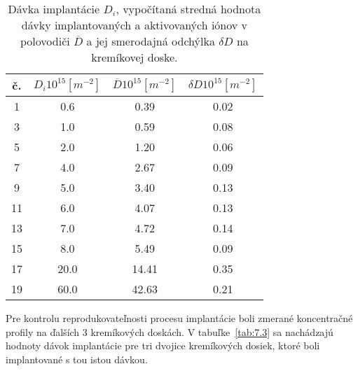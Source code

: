 \begin{table}[h!]\centering
  \begin{minipage}[c]{\myfiguresize}
    \begin{center}
      \begin{tabular}{c c c c}
        č. & ${D_{i}}{10}^{15}[m^{-2}]$ & $\overline{D}{10}^{15}[m^{-2}]$ & $\delta{D}{10}^{15}[m^{-2}]$\\
        \hline
         1 &  0.6 &  0.39 &  0.02\\
         3 &  1.0 &  0.59 &  0.08\\
         5 &  2.0 &  1.20 &  0.06\\
         7 &  4.0 &  2.67 &  0.09\\
         9 &  5.0 &  3.40 &  0.13\\
        11 &  6.0 &  4.07 &  0.13\\
        13 &  7.0 &  4.72 &  0.14\\
        15 &  8.0 &  5.49 &  0.09\\
        17 & 20.0 & 14.41 &  0.35\\
        19 & 60.0 & 42.63 &  0.21\\
      \end{tabular}
    \end{center}
    \caption[Dávky implantácie $D_{i}$]{Dávka implantácie $D_{i}$,
      vypočítaná stredná hodnota dávky implantovaných a aktivovaných
      iónov v polovodiči $\overline D$ a jej smerodajná odchýlka
      $\delta D$ na kremíkovej doske.}\label{tab:7.2}
  \end{minipage}
\end{table}

Pre kontrolu reprodukovateľnosti procesu implantácie boli zmerané
koncentračné profily na ďalších 3 kremíkových doskách.  V
tabuľke~\ref{tab:7.3} sa nachádzajú hodnoty dávok implantácie pre tri
dvojice kremíkových dosiek, ktoré boli implantované s tou istou
dávkou.

